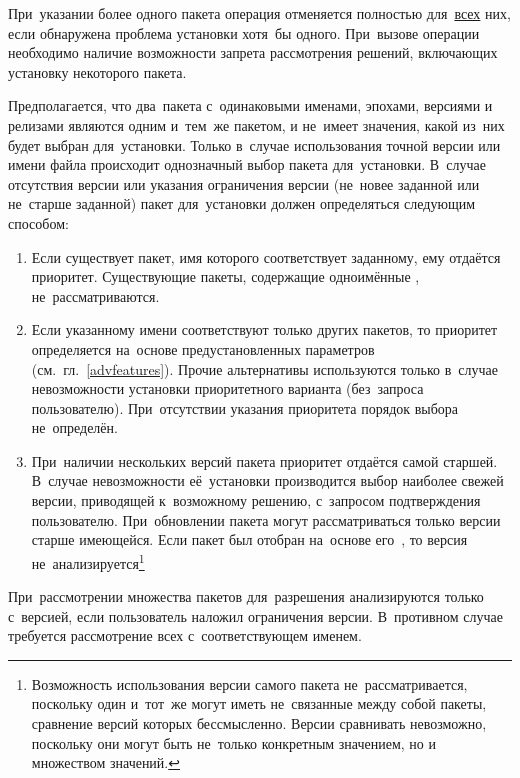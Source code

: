 При~указании более одного пакета операция отменяется полностью для~\underline{всех} них, 
если обнаружена проблема установки хотя~бы одного.
При~вызове операции необходимо наличие возможности запрета рассмотрения решений, 
включающих установку некоторого пакета. 

Предполагается, что два~пакета с~одинаковыми именами, эпохами, версиями и релизами являются одним и~тем~же пакетом,
и не~имеет значения, какой из~них будет выбран для~установки.
Только в~случае использования точной версии или имени файла происходит однозначный выбор пакета для~установки.
В~случае отсутствия версии или указания ограничения версии (не~новее заданной или не~старше заданной)
пакет для~установки должен определяться следующим способом:

\begin{enumerate}

\item{
Если существует пакет, имя которого соответствует заданному, ему отдаётся приоритет.
Существующие пакеты, содержащие одноимённые , не~рассматриваются.
}

\item {
Если указанному имени соответствуют только  других пакетов,
то приоритет определяется на~основе предустановленных параметров (см.~гл.~\ref{advfeatures}).
Прочие альтернативы используются только в~случае невозможности установки приоритетного варианта (без~запроса пользователю).
При~отсутствии указания приоритета порядок выбора не~определён.
}

\item {
При~наличии нескольких версий пакета приоритет отдаётся самой старшей.
В~случае невозможности её~установки производится выбор наиболее свежей версии, приводящей к~возможному решению, с~запросом подтверждения пользователю.
При~обновлении пакета могут рассматриваться только версии старше имеющейся.
Если пакет был отобран на~основе его~, 
то версия не~анализируется\footnote{Возможность использования версии самого пакета не~рассматривается,
поскольку один и~тот~же  могут иметь не~связанные между собой пакеты, сравнение версий которых бессмысленно.
Версии  сравнивать невозможно, поскольку они могут быть не~только конкретным значением, но и множеством значений.}
}

\end{enumerate}

При~рассмотрении множества пакетов для~разрешения 
анализируются  только с~версией, если пользователь наложил ограничения версии.
В~противном случае требуется рассмотрение всех  с~соответствующем именем.


